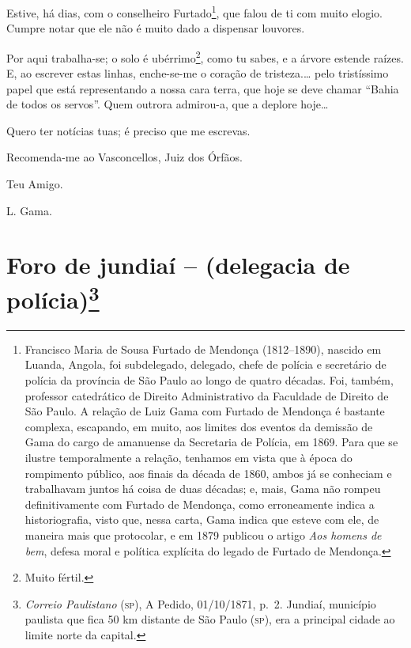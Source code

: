 {Estive, há dias, com o conselheiro Furtado\footnote{ Francisco Maria de
  Sousa Furtado de Mendonça (1812--1890), nascido em Luanda, Angola, foi
  subdelegado, delegado, chefe de polícia e secretário de polícia da
  província de São Paulo ao longo de quatro décadas. Foi, também,
  professor catedrático de Direito Administrativo da Faculdade de
  Direito de São Paulo. A relação de Luiz Gama com Furtado de Mendonça é
  bastante complexa, escapando, em muito, aos limites dos eventos da
  demissão de Gama do cargo de amanuense da Secretaria de Polícia, em
  1869. Para que se ilustre temporalmente a relação, tenhamos em vista
  que à época do rompimento público, aos finais da década de 1860, ambos
  já se conheciam e trabalhavam juntos há coisa de duas décadas; e,
  mais, Gama não rompeu definitivamente com Furtado de Mendonça, como
  erroneamente indica a historiografia, visto que, nessa carta, Gama
  indica que esteve com ele, de maneira mais que protocolar, e em 1879
  publicou o artigo \emph{Aos homens de bem}, defesa moral e política
  explícita do legado de Furtado de Mendonça.}, que falou de ti com
muito elogio. Cumpre notar que ele não é muito dado a dispensar
louvores.

Por aqui {trabalha-se}; o solo é ubérrimo\footnote{ Muito fértil.},
como tu sabes, e a árvore estende raízes. E, ao escrever estas linhas,
enche-se-me o coração de tristeza.\ldots{} pelo tristíssimo papel que
está representando a nossa cara terra, que hoje se deve chamar ``Bahia de
todos os servos''. Quem outrora admirou-a, que a deplore hoje\ldots{}

Quero ter notícias tuas; é preciso que me escrevas.

Recomenda-me ao Vasconcellos, Juiz dos Órfãos.

Teu Amigo.

L. Gama.

\chapter{Foro de jundiaí -- (delegacia de polícia)\footnote{\emph{Correio Paulistano} (\textsc{sp}), A Pedido, 01/10/1871,
  p.~2. Jundiaí, município paulista que fica 50 km distante de São Paulo
  (\textsc{sp}), era a principal cidade ao limite norte da capital.}} %

}
